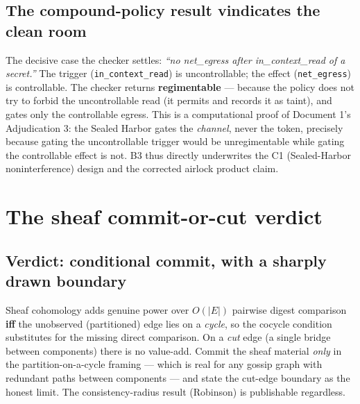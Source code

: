 \documentclass[11pt,a4paper]{article}
\begin{document}
\subsection{The compound-policy result vindicates the clean room}
The decisive case the checker settles: \emph{``no net\_egress after in\_context\_read of a secret.''} The trigger (\texttt{in\_context\_read}) is uncontrollable; the effect (\texttt{net\_egress}) is controllable. The checker returns \textbf{regimentable} --- because the policy does not try to forbid the uncontrollable read (it permits and records it as taint), and gates only the controllable egress. This is a computational proof of Document 1's Adjudication 3: the Sealed Harbor gates the \emph{channel}, never the token, precisely because gating the uncontrollable trigger would be unregimentable while gating the controllable effect is not. B3 thus directly underwrites the C1 (Sealed-Harbor noninterference) design and the corrected airlock product claim.

\section{The sheaf commit-or-cut verdict}
\subsection{Verdict: conditional commit, with a sharply drawn boundary}
\begin{verdict}
Sheaf cohomology adds genuine power over $O(|E|)$ pairwise digest comparison \textbf{iff} the unobserved (partitioned) edge lies on a \emph{cycle}, so the cocycle condition substitutes for the missing direct comparison. On a \emph{cut} edge (a single bridge between components) there is no value-add. Commit the sheaf material \emph{only} in the partition-on-a-cycle framing --- which is real for any gossip graph with redundant paths between components --- and state the cut-edge boundary as the honest limit. The consistency-radius result (Robinson) is publishable regardless.
\end{verdict}
\end{document}
